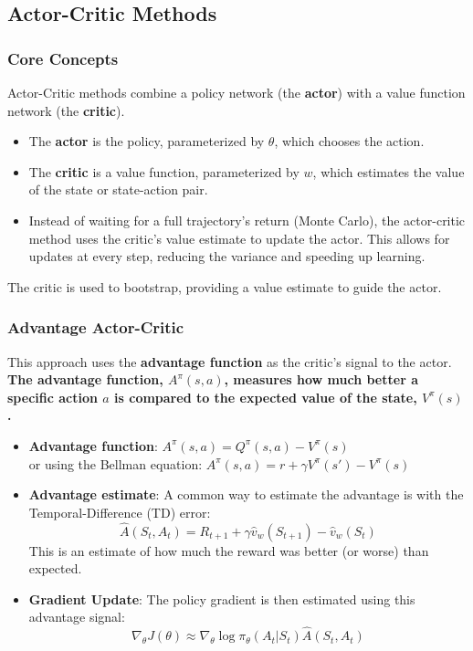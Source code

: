 \documentclass[12pt]{article}
\begin{document}
\subsection{Actor-Critic Methods}

\subsubsection{Core Concepts}
Actor-Critic methods combine a policy network (the \textbf{actor}) with a value function network (the \textbf{critic}).
\begin{itemize}
    \item The \textbf{actor} is the policy, parameterized by $\theta$, which chooses the action.
    \item The \textbf{critic} is a value function, parameterized by $w$, which estimates the value of the state or state-action pair.
    \item Instead of waiting for a full trajectory's return (Monte Carlo), the actor-critic method uses the critic's value estimate to update the actor. This allows for updates at every step, reducing the variance and speeding up learning.
\end{itemize}
The critic is used to bootstrap, providing a value estimate to guide the actor.

\subsubsection{Advantage Actor-Critic}
This approach uses the \textbf{advantage function} as the critic's signal to the actor. \textbf{The advantage function, $A^{\pi}(s,a)$, measures how much better a specific action $a$ is compared to the expected value of the state, $V^{\pi}(s)$.}
\begin{itemize}
    \item \textbf{Advantage function}:
    $A^\pi(s,a) = Q^\pi(s,a) - V^\pi(s)$ \\
    
     or using the Bellman equation:
    $A^\pi(s,a) = r + \gamma V^\pi(s') - V^\pi(s)$
    \item \textbf{Advantage estimate}: A common way to estimate the advantage is with the Temporal-Difference (TD) error:
    $$ \hat{A}(S_t, A_t) = R_{t+1} + \gamma \hat{v}_w(S_{t+1}) - \hat{v}_w(S_t) $$
    This is an estimate of how much the reward was better (or worse) than expected.
    \item \textbf{Gradient Update}: The policy gradient is then estimated using this advantage signal:
    $$ \nabla_\theta J(\theta) \approx \nabla_\theta \log \pi_\theta(A_t|S_t) \hat{A}(S_t, A_t) $$
\end{itemize}
\end{document}

